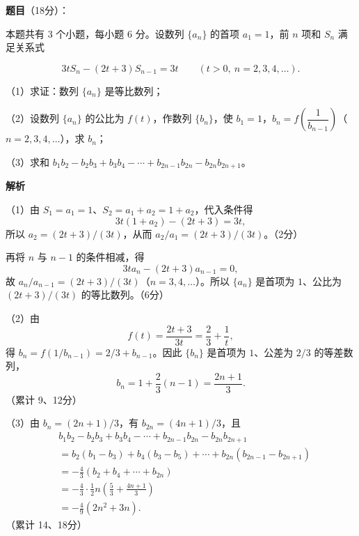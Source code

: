 \begin{answer}

\textbf{题目}（18分）：

本题共有 3 个小题，每小题 6 分。设数列 $\{a_n\}$ 的首项 $a_1=1$，前 $n$ 项和 $S_n$ 满足关系式

\nopagebreak[4]
\[3tS_n-(2t+3)S_{n-1}=3t\qquad(t>0,\ n=2,3,4,\ldots).\]

（1）求证：数列 $\{a_n\}$ 是等比数列；

（2）设数列 $\{a_n\}$ 的公比为 $f(t)$，作数列 $\{b_n\}$，使 $b_1=1$，$b_n=f\!\left(\dfrac1{b_{n-1}}\right)$（$n=2,3,4,\ldots$），求 $b_n$；

（3）求和 $b_1b_2-b_2b_3+b_3b_4-\cdots+b_{2n-1}b_{2n}-b_{2n}b_{2n+1}$。

\textbf{解析}

（1）由 $S_1=a_1=1$、$S_2=a_1+a_2=1+a_2$，代入条件得
\nopagebreak[4]
\[3t(1+a_2)-(2t+3)=3t,\]
所以 $a_2=(2t+3)/(3t)$，从而 $a_2/a_1=(2t+3)/(3t)$。（2分）

再将 $n$ 与 $n-1$ 的条件相减，得
\nopagebreak[4]
\[3ta_n-(2t+3)a_{n-1}=0,\]
故 $a_n/a_{n-1}=(2t+3)/(3t)$（$n=3,4,\ldots$）。所以 $\{a_n\}$ 是首项为 $1$、公比为 $(2t+3)/(3t)$ 的等比数列。（6分）

（2）由
\nopagebreak[4]
\[f(t)=\frac{2t+3}{3t}=\frac23+\frac1t,\]
得 $b_n=f(1/b_{n-1})=2/3+b_{n-1}$。因此 $\{b_n\}$ 是首项为 $1$、公差为 $2/3$ 的等差数列，
\nopagebreak[4]
\[b_n=1+\frac23(n-1)=\frac{2n+1}{3}.\]
（累计 9、12分）

（3）由 $b_n=(2n+1)/3$，有 $b_{2n}=(4n+1)/3$，且
\nopagebreak[4]
\[\begin{aligned}
&b_1b_2-b_2b_3+b_3b_4-\cdots+b_{2n-1}b_{2n}-b_{2n}b_{2n+1}\\
&=b_2(b_1-b_3)+b_4(b_3-b_5)+\cdots+b_{2n}(b_{2n-1}-b_{2n+1})\\
&=-\frac43(b_2+b_4+\cdots+b_{2n})\\
&=-\frac43\cdot\frac12 n\left(\frac53+\frac{4n+1}{3}\right)\\
&=-\frac49(2n^2+3n).
\end{aligned}\]
（累计 14、18分）


\end{answer}